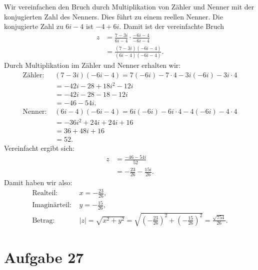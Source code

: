 \documentclass{article}
\theoremstyle{definition}
\theoremstyle{remark}
\begin{document}
Wir vereinfachen den Bruch durch Multiplikation von Zähler und Nenner mit der konjugierten Zahl des Nenners. Dies führt zu einem reellen Nenner. Die konjugierte Zahl zu \( 6i - 4 \) ist \( -4 + 6i \). Damit ist der vereinfachte Bruch
\begin{align*}
	z & = \frac{7 - 3i}{6i - 4} \cdot \frac{-6i - 4}{-6i - 4} \\
	  & = \frac{(7 - 3i)(-6i - 4)}{(6i - 4)(-6i - 4)}.
\end{align*}
Durch Multiplikation im Zähler und Nenner erhalten wir:
\begin{align*}
	\text{Zähler: } & (7 - 3i)(-6i - 4) = 7(-6i) - 7 \cdot 4 - 3i(-6i) - 3i \cdot 4 \\
	                & = -42i - 28 + 18i^2 - 12i                                     \\
	                & = -42i - 28 - 18 - 12i                                        \\
	                & = -46 - 54i.                                                  \\
	\text{Nenner: } & (6i - 4)(-6i - 4) = 6i(-6i) - 6i \cdot 4 - 4(-6i) - 4 \cdot 4 \\
	                & = -36i^2 + 24i + 24i + 16                                     \\
	                & = 36 + 48i + 16                                               \\
	                & = 52.
\end{align*}
Vereinfacht ergibt sich:
\begin{align*}
	z & = \frac{-46 - 54i}{52}             \\
	  & = -\frac{23}{26} - \frac{15i}{26}.
\end{align*}
Damit haben wir also:
\begin{align*}
	\text{Realteil: }     & x = -\frac{23}{26},                                                                                                    \\
	\text{Imaginärteil: } & y = -\frac{15}{26},                                                                                                    \\
	\text{Betrag: }       & |z| = \sqrt{x^2 + y^2} = \sqrt{\left(-\frac{23}{26}\right)^2 + \left(-\frac{15}{26}\right)^2} = \frac{\sqrt{754}}{26}.
\end{align*}

\section*{Aufgabe 27}
\end{document}
